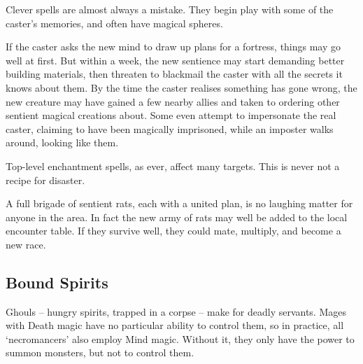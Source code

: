 \begin{multicols}{2}
Clever spells are almost always a mistake.
They begin play with some of the caster's memories, and often have magical spheres.

If the caster asks the new mind to draw up plans for a fortress, things may go well at first.
But within a week, the new sentience may start demanding better building materials, then threaten to blackmail the caster with all the secrets it knows about them.
By the time the caster realises something has gone wrong, the new creature may have gained a few nearby allies and taken to ordering other sentient magical creations about.
Some even attempt to impersonate the real caster, claiming to have been magically imprisoned, while an imposter walks around, looking like them.


Top-level enchantment spells, as ever, affect many targets.
This is never not a recipe for disaster.

A full brigade of sentient rats, each with a united plan, is no laughing matter for anyone in the area.
In fact the new army of rats may well be added to the local encounter table.
If they survive well, they could mate, multiply, and become a new race.

\subsection{Bound Spirits}

Ghouls -- hungry spirits, trapped in a corpse -- make for deadly servants.
Mages with Death magic have no particular ability to control them, so in practice, all `necromancers' also employ Mind magic.
Without it, they only have the power to summon monsters, but not to control them.

\end{multicols}
